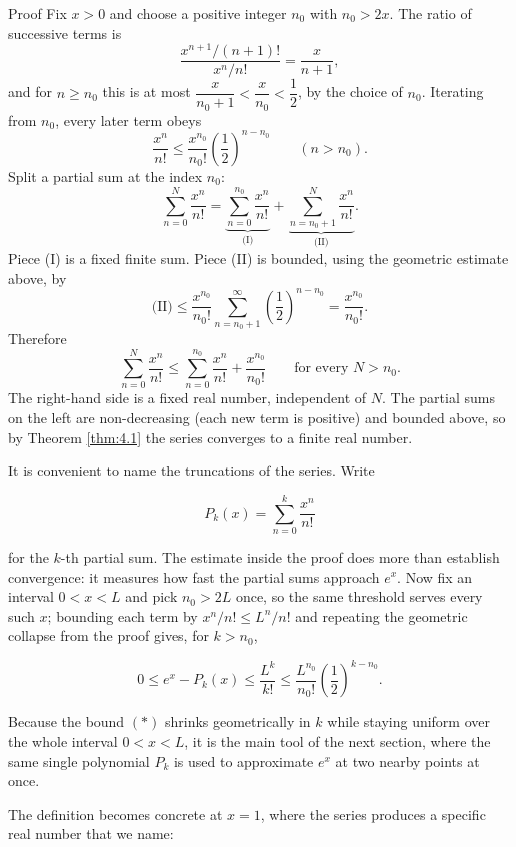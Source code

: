 \documentclass[a4paper,12pt,oneside]{memoir}
\begin{document}
\begin{envproof}{Proof}{}{}
Fix \(x > 0\) and choose a positive integer \(n_{0}\) with \(n_{0} > 2x\). The ratio of successive terms is \[ \frac{x^{n + 1}/(n + 1)!}{x^{n}/n!} = \frac{x}{n + 1}, \] and for \(n \ge n_{0}\) this is at most \(\dfrac{x}{n_{0} + 1} < \dfrac{x}{n_{0}} < \dfrac{1}{2}\), by the choice of \(n_{0}\). Iterating from \(n_{0}\), every later term obeys \[ \frac{x^{n}}{n!} \le \frac{x^{n_{0}}}{n_{0}!} \left(\frac{1}{2}\right)^{n - n_{0}} \qquad (n > n_{0}). \] Split a partial sum at the index \(n_{0}\): \[ \sum_{n = 0}^{N} \frac{x^{n}}{n!} = \underbrace{\sum_{n = 0}^{n_{0}} \frac{x^{n}}{n!}}_{\text{(I)}} + \underbrace{\sum_{n = n_{0} + 1}^{N} \frac{x^{n}}{n!}}_{\text{(II)}}. \] Piece (I) is a fixed finite sum. Piece (II) is bounded, using the geometric estimate above, by \[ \text{(II)} \le \frac{x^{n_{0}}}{n_{0}!} \sum_{n = n_{0} + 1}^{\infty} \left(\frac{1}{2}\right)^{n - n_{0}} = \frac{x^{n_{0}}}{n_{0}!}. \] Therefore \[ \sum_{n = 0}^{N} \frac{x^{n}}{n!} \le \sum_{n = 0}^{n_{0}} \frac{x^{n}}{n!} + \frac{x^{n_{0}}}{n_{0}!} \qquad \text{for every } N > n_{0}. \] The right-hand side is a fixed real number, independent of \(N\). The partial sums on the left are non-decreasing (each new term is positive) and bounded above, so by Theorem \ref{thm:4.1} the series converges to a finite real number. \qedmark
\end{envproof}
It is convenient to name the truncations of the series. Write

\[ P_{k}(x) = \sum_{n = 0}^{k} \frac{x^{n}}{n!} \]

for the \(k\)-th partial sum. The estimate inside the proof does more than establish convergence: it measures how fast the partial sums approach \(e^{x}\). Now fix an interval \(0 < x < L\) and pick \(n_{0} > 2L\) once, so the same threshold serves every such \(x\); bounding each term by \(x^{n}/n! \le L^{n}/n!\) and repeating the geometric collapse from the proof gives, for \(k > n_{0}\),

\[ 0 \le e^{x} - P_{k}(x) \le \frac{L^{k}}{k!} \le \frac{L^{n_{0}}}{n_{0}!} \left(\frac{1}{2}\right)^{k - n_{0}}. \tag{$*$} \]

Because the bound \((*)\) shrinks geometrically in \(k\) while staying uniform over the whole interval \(0 < x < L\), it is the main tool of the next section, where the same single polynomial \(P_{k}\) is used to approximate \(e^{x}\) at two nearby points at once.

The definition becomes concrete at \(x = 1\), where the series produces a specific real number that we name:
\end{document}
